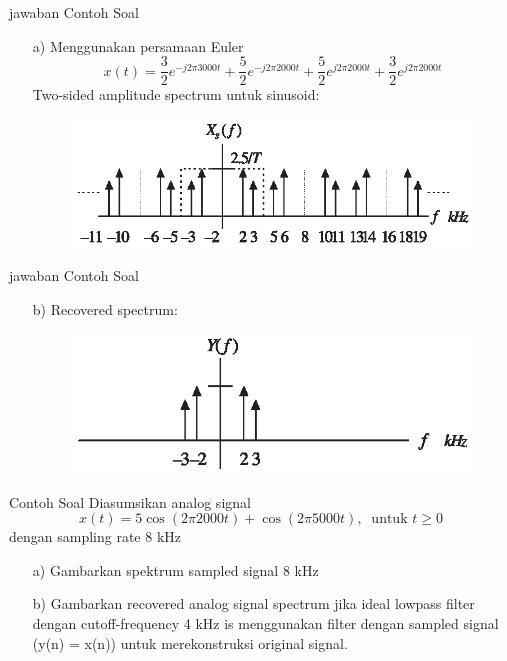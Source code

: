\documentclass[pdflatex,compress,mathserif]{beamer}
\begin{document}
\begin{frame}{jawaban Contoh Soal}
    \begin{enumerate}
        \item[a)] Menggunakan persamaan Euler
        $$x(t) = \frac{3}{2}e^{-j2 \pi 3000 t} + \frac{5}{2}e^{-j2 \pi 2000 t} + \frac{5}{2}e^{j2 \pi 2000 t} + \frac{3}{2}e^{j2 \pi 2000 t} $$
        Two-sided amplitude spectrum untuk sinusoid:
        \begin{figure}
            \includegraphics[width=\linewidth]{img/img18}
        \end{figure}
    \end{enumerate}
\end{frame}

\begin{frame}{jawaban Contoh Soal}
    \begin{enumerate}
        \item[b)] Recovered spectrum:
        \begin{figure}
            \includegraphics[width=\linewidth]{img/img19}
        \end{figure}
    \end{enumerate}
\end{frame}

\begin{frame}{Contoh Soal}
    Diasumsikan analog signal $$ x(t) = 5 \cos(2\pi 2000 t) + \cos(2\pi 5000t),~\text{ untuk } t \geq 0 $$ dengan sampling rate 8 kHz
    \begin{enumerate}
        \item[a)] Gambarkan spektrum sampled signal 8 kHz
        \item[b)] Gambarkan recovered analog signal spectrum jika ideal lowpass filter dengan cutoff-frequency 4 kHz is menggunakan filter dengan sampled signal (y(n) = x(n)) untuk merekonstruksi original signal.
    \end{enumerate}
\end{frame}
\end{document}
